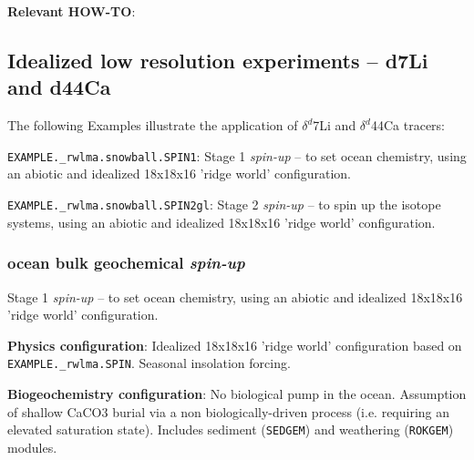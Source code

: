 \documentclass[10pt,twoside]{article}
\begin{document}
\noindent \textbf{Relevant HOW-TO}:


\subsection{Idealized low resolution experiments -- d7Li and d44Ca}

The following Examples illustrate the application of $\delta^{d}$7Li and $\delta^{d}$44Ca tracers:

\begin{compactenum}
                        
\item \texttt{EXAMPLE.\_rwlma.snowball.SPIN1}: Stage 1 \textit{spin-up} -- to set ocean chemistry, using an abiotic and idealized 18x18x16 'ridge world' configuration.
                        
\item \texttt{EXAMPLE.\_rwlma.snowball.SPIN2gl}: Stage 2 \textit{spin-up} -- to spin up the isotope systems, using an abiotic and idealized 18x18x16 'ridge world' configuration.                 
                                
\end{compactenum}


\subsubsection{ocean bulk geochemical \textit{spin-up}}\label{EXAMPLE.rwlma.snowball.SPIN1}

Stage 1 \textit{spin-up} -- to set ocean chemistry, using an abiotic and idealized 18x18x16 'ridge world' configuration.

\noindent \textbf{Physics configuration}: Idealized 18x18x16 'ridge world' configuration based on \texttt{EXAMPLE.\_rwlma.SPIN}. Seasonal insolation forcing.

\noindent \textbf{Biogeochemistry configuration}: No biological pump in the ocean. Assumption of shallow CaCO3 burial via a non biologically-driven process (i.e. requiring an elevated saturation state). Includes sediment (\texttt{SEDGEM}) and weathering (\texttt{ROKGEM}) modules.
\end{document}
